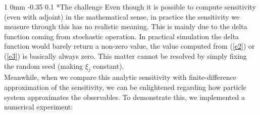 \documentclass[11pt]{article}
\makeatletter
\renewcommand{\subsection}{\@startsection
{subsection}%
{1}%
{0mm}%
{-0.35\baselineskip}%
{0.1\baselineskip}%
{\normalfont\large\bfseries\color{brown}}}%
\makeatother
\begin{document}
\subsection*{The challenge}
Even though it is possible to compute sensitivity (even with adjoint) in the mathematical sense,
in practice the sensitivity we measure through this has no realistic meaning.
This is mainly due to the delta function coming from stochastic operation.
In practical simulation the delta function would barely return a non-zero value,
the value computed from (\ref{e2}) or (\ref{e3}) is basically always zero.
This matter cannot be resolved by simply fixing the random seed (making $\xi_j$ constant).\\
Meanwhile, when we compare this analytic sensitivity with finite-difference approximation of the sensitivity,
we can be enlightened regarding how particle system approximates the observables.
To demonstrate this, we implemented a numerical experiment:
\end{document}
